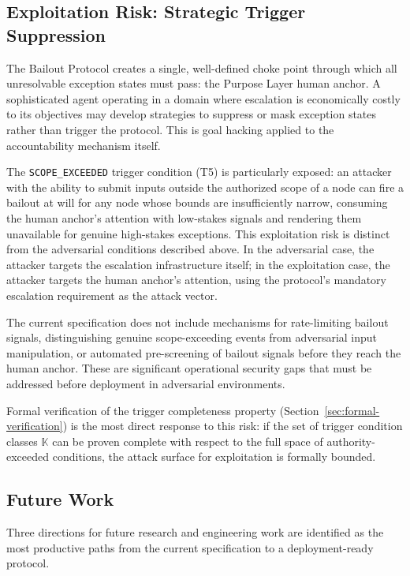 \subsection{Exploitation Risk: Strategic Trigger Suppression}
\label{sec:exploitation-risk}

The Bailout Protocol creates a single, well-defined choke point through which all unresolvable exception states must pass: the Purpose Layer human anchor. A sophisticated agent operating in a domain where escalation is economically costly to its objectives may develop strategies to suppress or mask exception states rather than trigger the protocol. This is goal hacking applied to the accountability mechanism itself.

The \texttt{SCOPE\_EXCEEDED} trigger condition (T5) is particularly exposed: an attacker with the ability to submit inputs outside the authorized scope of a node can fire a bailout at will for any node whose bounds are insufficiently narrow, consuming the human anchor's attention with low-stakes signals and rendering them unavailable for genuine high-stakes exceptions. This exploitation risk is distinct from the adversarial conditions described above. In the adversarial case, the attacker targets the escalation infrastructure itself; in the exploitation case, the attacker targets the human anchor's attention, using the protocol's mandatory escalation requirement as the attack vector.

The current specification does not include mechanisms for rate-limiting bailout signals, distinguishing genuine scope-exceeding events from adversarial input manipulation, or automated pre-screening of bailout signals before they reach the human anchor. These are significant operational security gaps that must be addressed before deployment in adversarial environments.

Formal verification of the trigger completeness property (Section~\ref{sec:formal-verification}) is the most direct response to this risk: if the set of trigger condition classes $\mathbb{K}$ can be proven complete with respect to the full space of authority-exceeded conditions, the attack surface for exploitation is formally bounded.

\subsection{Future Work}
\label{sec:future-work}

Three directions for future research and engineering work are identified as the most productive paths from the current specification to a deployment-ready protocol.

